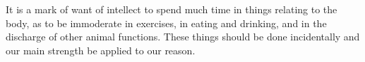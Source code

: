 It is a mark of want of intellect  to spend much time in things relating to the
body, as  to be  immoderate in exercises,  in eating and  drinking, and  in the
discharge of other  animal functions. These things should  be done incidentally
and our main strength be applied to our reason.
